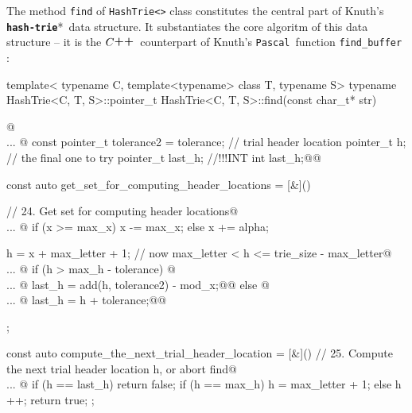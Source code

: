 \documentclass[a4paper,11pt]{article}
\makeatletter
\renewcommand{\=}{\protect\nobreakdash-\hspace{0pt}}
\renewcommand{\~}{\protect\nobreakdash--\hspace{0pt}}
\newcommand{\plusplus}{\textbf{\raisebox{1pt}{++}}}
\newcommand{\cplusplus}{$C\plusplus$}
\newcommand{\pascal}{\code{Pascal}}
\newcommand{\hashtrie}{{\tt\textbf{hash-trie}}}
\newcommand\hashtrie*{\emph{hash\=trie}}
\newcommand{\code}[1]{{\tt{#1}}}
\newcommand\code*[1]{\mbox{\code{#1}}}
\newcommand{\pp}[2]{pp.~#1\~#2}
\newcommand{\paras}[2]{\mbox{\S\hspace{1pt}#1--#2}}
\newcommand{\paraspp}[4]{\paras{#1}{#2} on \pp{#3}{#4}}
\let\lst@ifskiplines\iffalse
\newcommand\skipnumbering[1]{%
	\setcounter{lstnumber}{\numexpr#1-1\relax}%
	\let\lst@ifskiplines\iftrue
	\\\lst@PlaceNumber
	\let\lst@ifskiplines\iffalse
	\lst@ifshowskiplines...\fi
}
\let\lst@PlaceNumber\@empty
\makeatother
\begin{document}
%
The method \code{find} of \code{HashTrie<>} class constitutes the central part
of Knuth's \hashtrie*\ data structure. It substantiates the core algoritm of this
data structure -- it is the \cplusplus\ counterpart of Knuth's \pascal\ function
\code{find\_buffer}
\cite[\paras{20}{21} and \paraspp{24}{31}{159}{162}]{knuth:literate}:
%
%
\begin{hashtrielisting}[2321]
template<
	typename C,
	template<typename> class T,
	typename S>
typename
	HashTrie<C, T, S>::pointer_t
	HashTrie<C, T, S>::find(const char_t* str)
{@\skipnumbering{2445}@
	const pointer_t tolerance2 = tolerance;
	// trial header location
	pointer_t h;
	// the final one to try
	pointer_t last_h; //!!!INT int last_h;@\label{cpp-last-h-def}@

	const auto get_set_for_computing_header_locations = [&]() {
		// 24. Get set for computing header locations@\skipnumbering{2477}@
		if (x >= max_x)
			x -= max_x;
		else
			x += alpha;

		h = x + max_letter + 1; // now max_letter < h <= trie_size - max_letter@\skipnumbering{2506}@
		if (h > max_h - tolerance) {@\skipnumbering{2523}@
			last_h = add(h, tolerance2) - mod_x;@\label{cpp-last-h-assign-1}@
		}
		else {@\skipnumbering{2533}@
			last_h = h + tolerance;@\label{cpp-last-h-assign-2}@
		}
	};

	const auto compute_the_next_trial_header_location = [&]() {
		// 25. Compute the next trial header location h, or abort find@\skipnumbering{2545}@
		if (h == last_h)
			return false;
		if (h == max_h)
			h = max_letter + 1;
		else
			h ++;
		return true;
	};

}
\end{hashtrielisting}
\end{document}
